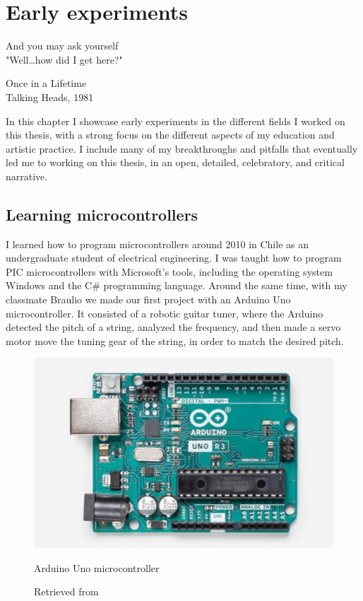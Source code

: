 \chapter{Early experiments}

\epigraph{And you may ask yourself \\ "Well\dots how did I get here?"}{Once in a Lifetime \\ Talking Heads, 1981}

In this chapter I showcase early experiments in the different fields I worked on this thesis, with a strong focus on the different aspects of my education and artistic practice.  I include many of my breakthroughs and pitfalls that eventually led me to working on this thesis, in an open, detailed, celebratory, and critical narrative.

\section{Learning microcontrollers}

I learned how to program microcontrollers around 2010 in Chile as an undergraduate student of electrical engineering. I was taught how to program PIC microcontrollers with Microsoft's tools, including the operating system Windows and the C\# programming language. Around the same time, with my classmate Braulio we made our first project with an Arduino Uno microcontroller. It consisted of a robotic guitar tuner, where the Arduino detected the pitch of a string, analyzed the frequency, and then made a servo motor move the tuning gear of the string, in order to match the desired pitch.

\begin{figure}[ht]
  \centering
  \includegraphics[width=0.75\linewidth,height=0.25\textheight,keepaspectratio]{images/arduino-uno.jpg}
  \caption{Arduino Uno microcontroller}
  \caption*{Retrieved from \cite{website-arduino-uno}}
  \label{fig:arduino-uno}
\end{figure}

